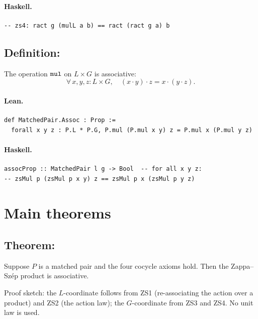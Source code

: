 \documentclass[11pt,a4paper]{article}
\begin{document}
\paragraph{Haskell.}
\begin{lstlisting}[style=haskell]
-- zs4: ract g (mulL a b) == ract (ract g a) b
\end{lstlisting}


\subsection{Definition: }

\begin{defn}
The operation $\texttt{mul}$ on $L \times G$ is associative:
\[
  \forall\, x, y, z : L \times G,\quad
  (x \cdot y) \cdot z = x \cdot (y \cdot z).
\]
\end{defn}

\paragraph{Lean.}
\begin{lstlisting}[style=lean]
def MatchedPair.Assoc : Prop :=
  forall x y z : P.L * P.G, P.mul (P.mul x y) z = P.mul x (P.mul y z)
\end{lstlisting}

\paragraph{Haskell.}
\begin{lstlisting}[style=haskell]
assocProp :: MatchedPair l g -> Bool  -- for all x y z:
-- zsMul p (zsMul p x y) z == zsMul p x (zsMul p y z)
\end{lstlisting}


\section{Main theorems}

\subsection{Theorem: }

\begin{thm}
Suppose $P$ is a matched pair and the four cocycle axioms hold.
Then the Zappa--Sz\'{e}p product is associative.

Proof sketch: the $L$-coordinate follows from ZS1 (re-associating the action over
a product) and ZS2 (the action law); the $G$-coordinate from ZS3 and ZS4.
No unit law is used.
\end{thm}
\end{document}
